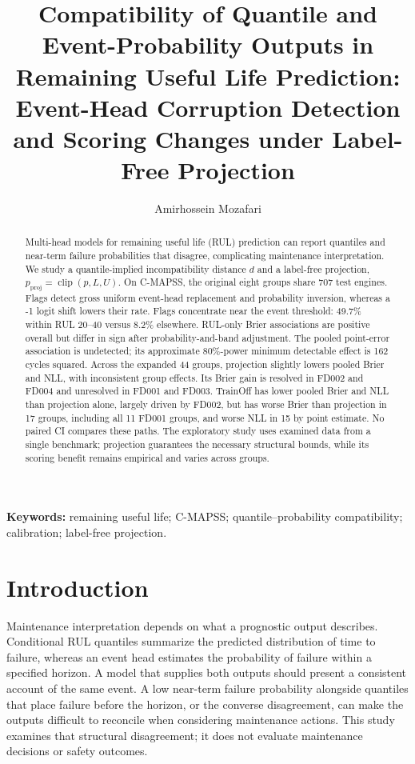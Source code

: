 \documentclass[IJPHM, 2026, 0]{phmsociety}
\begin{document}
\title{Compatibility of Quantile and Event-Probability Outputs in Remaining Useful Life Prediction: Event-Head Corruption Detection and Scoring Changes under Label-Free Projection}
\author{Amirhossein Mozafari}
\address{}
\maketitle
\pagestyle{fancy}
\thispagestyle{plain}
\begin{abstract}%
Multi-head models for remaining useful life (RUL) prediction can report quantiles and near-term failure probabilities that disagree, complicating maintenance interpretation. We study a quantile-implied incompatibility distance \(d\) and a label-free projection, \(p_{\mathrm{proj}}=\operatorname{clip}(p,L,U)\). On C-MAPSS, the original eight groups share 707 test engines. Flags detect gross uniform event-head replacement and probability inversion, whereas a -1 logit shift lowers their rate. Flags concentrate near the event threshold: 49.7\% within RUL 20--40 versus 8.2\% elsewhere. RUL-only Brier associations are positive overall but differ in sign after probability-and-band adjustment. The pooled point-error association is undetected; its approximate 80\%-power minimum detectable effect is 162 cycles squared. Across the expanded 44 groups, projection slightly lowers pooled Brier and NLL, with inconsistent group effects. Its Brier gain is resolved in FD002 and FD004 and unresolved in FD001 and FD003. TrainOff has lower pooled Brier and NLL than projection alone, largely driven by FD002, but has worse Brier than projection in 17 groups, including all 11 FD001 groups, and worse NLL in 15 by point estimate. No paired CI compares these paths. The exploratory study uses examined data from a single benchmark; projection guarantees the necessary structural bounds, while its scoring benefit remains empirical and varies across groups.
\end{abstract}
\textbf{Keywords:} remaining useful life; C-MAPSS; quantile--probability compatibility; calibration; label-free projection.

\section{Introduction}

Maintenance interpretation depends on what a prognostic output describes. Conditional RUL quantiles summarize the predicted distribution of time to failure, whereas an event head estimates the probability of failure within a specified horizon. A model that supplies both outputs should present a consistent account of the same event. A low near-term failure probability alongside quantiles that place failure before the horizon, or the converse disagreement, can make the outputs difficult to reconcile when considering maintenance actions. This study examines that structural disagreement; it does not evaluate maintenance decisions or safety outcomes.
\end{document}
